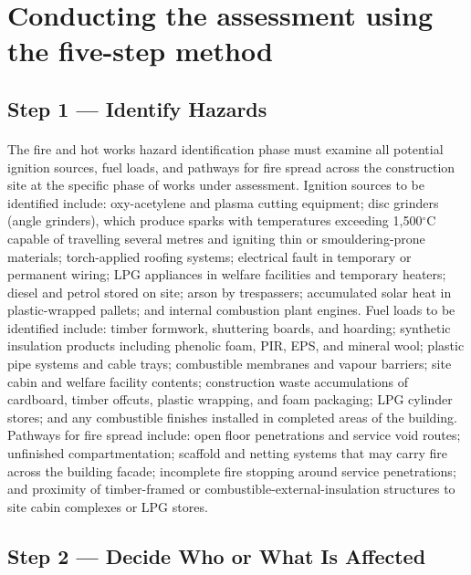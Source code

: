 \section{Conducting the assessment using the five-step method}

\subsection{Step 1 --- Identify Hazards}

\paragraph{}
The fire and hot works hazard identification phase must examine all potential ignition sources, fuel loads, and pathways for fire spread across the construction site at the specific phase of works under assessment. Ignition sources to be identified include: oxy-acetylene and plasma cutting equipment; disc grinders (angle grinders), which produce sparks with temperatures exceeding 1{,}500$^{\circ}$C capable of travelling several metres and igniting thin or smouldering-prone materials; torch-applied roofing systems; electrical fault in temporary or permanent wiring; LPG appliances in welfare facilities and temporary heaters; diesel and petrol stored on site; arson by trespassers; accumulated solar heat in plastic-wrapped pallets; and internal combustion plant engines. Fuel loads to be identified include: timber formwork, shuttering boards, and hoarding; synthetic insulation products including phenolic foam, PIR, EPS, and mineral wool; plastic pipe systems and cable trays; combustible membranes and vapour barriers; site cabin and welfare facility contents; construction waste accumulations of cardboard, timber offcuts, plastic wrapping, and foam packaging; LPG cylinder stores; and any combustible finishes installed in completed areas of the building. Pathways for fire spread include: open floor penetrations and service void routes; unfinished compartmentation; scaffold and netting systems that may carry fire across the building facade; incomplete fire stopping around service penetrations; and proximity of timber-framed or combustible-external-insulation structures to site cabin complexes or LPG stores.

\subsection{Step 2 --- Decide Who or What Is Affected}

